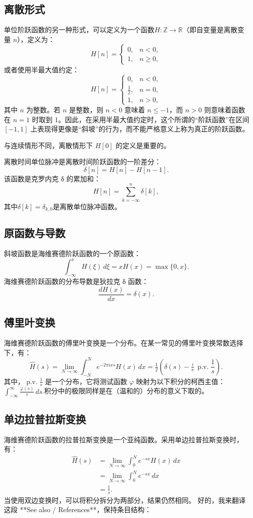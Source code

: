 \subsection{离散形式}
单位阶跃函数的另一种形式，可以定义为一个函数$H : \mathbb{Z} \to \mathbb{R}$（即自变量是离散变量 $n$），定义为：
$$
H[n] =
\begin{cases}
0, & n < 0, \\[6pt]
1, & n \geq 0,
\end{cases}~
$$
或者使用半最大值约定：
$$
H[n] =
\begin{cases}
0, & n < 0, \\[6pt]
\tfrac{1}{2}, & n = 0, \\[6pt]
1, & n > 0,
\end{cases}~
$$
其中 $n$ 为整数。若 $n$ 是整数，则 $n < 0$ 意味着 $n \leq -1$，而 $n > 0$ 则意味着函数在 $n = 1$ 时取到 1。因此，在采用半最大值约定时，这个所谓的“阶跃函数”在区间 $[-1,1]$ 上表现得更像是“斜坡”的行为，而不能严格意义上称为真正的阶跃函数。

与连续情形不同，离散情形下 $H[0]$ 的定义是重要的。

离散时间单位脉冲是离散时间阶跃函数的一阶差分：
$$
\delta[n] = H[n] - H[n-1].~
$$
该函数是克罗内克 δ 的累加和：
$$
H[n] = \sum_{k=-\infty}^{n} \delta[k],~
$$
其中$\delta[k] = \delta_{k,0}$是离散单位脉冲函数。
\subsection{原函数与导数}
斜坡函数是海维赛德阶跃函数的一个原函数：
$$
\int_{-\infty}^{x} H(\xi)\, d\xi = xH(x) = \max\{0, x\}.~
$$
海维赛德阶跃函数的分布导数是狄拉克 δ 函数：
$$
\frac{dH(x)}{dx} = \delta(x).~
$$
\subsection{傅里叶变换}
海维赛德阶跃函数的傅里叶变换是一个分布。在某一常见的傅里叶变换常数选择下，有：
$$
\hat{H}(s) = \lim_{N \to \infty} \int_{-N}^{N} e^{-2\pi i x s} H(x)\, dx 
= \tfrac{1}{2}\left( \delta(s) - \tfrac{i}{\pi}\,\operatorname{p.v.}\frac{1}{s} \right).~
$$
其中，$\operatorname{p.v.}\tfrac{1}{s}$ 是一个分布，它将测试函数 $\varphi$ 映射为以下积分的柯西主值：$\int_{-\infty}^{\infty} \frac{\varphi(s)}{s}\, ds$.积分中的极限同样是在（温和的）分布的意义下取的。
\subsection{单边拉普拉斯变换}
海维赛德阶跃函数的拉普拉斯变换是一个亚纯函数。采用单边拉普拉斯变换时，有：
$$
\begin{aligned}
\hat{H}(s) &= \lim_{N \to \infty} \int_{0}^{N} e^{-sx} H(x)\, dx \\[6pt]
&= \lim_{N \to \infty} \int_{0}^{N} e^{-sx}\, dx \\[6pt]
&= \frac{1}{s}.
\end{aligned}~
$$
当使用双边变换时，可以将积分拆分为两部分，结果仍然相同。
好的，我来翻译这段 **See also / References**，保持条目结构：

